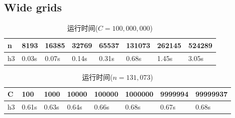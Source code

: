 \subsection{Wide grids}
\begin{table}[H]
  \caption{运行时间($C=100,000,000$)}
  \centering
  \begin{tabular}{p{1.5cm}<{\centering}p{1.5cm}<{\centering}p{1.5cm}<{\centering}p{1.5cm}<{\centering}p{1.5cm}<{\centering}p{1.5cm}<{\centering}p{1.5cm}<{\centering}p{1.5cm}<{\centering}}
  \toprule
   n & 8193 & 16385 & 32769 & 65537 & 131073 &262145 &524289\\
  \midrule
   h3  & 0.03s & 0.07s & 0.14s & 0.31s & 0.68s & 1.45s & 3.05s \\
  \bottomrule
  \end{tabular} 
\end{table}
\begin{table}[H]
  \caption{运行时间($n=131,073$)}
  \label{tab25}
  \centering
  \begin{tabular}{p{1.5cm}<{\centering}p{1.5cm}<{\centering}p{1.5cm}<{\centering}p{1.5cm}<{\centering}p{1.5cm}<{\centering}p{1.5cm}<{\centering}p{1.5cm}<{\centering}p{1.5cm}<{\centering}}
  \toprule
   C & 100 & 1000 & 10000 & 100000 & 1000000 &9999994 & 99999937\\
  \midrule
   h3  & 0.61s & 0.63s & 0.64s & 0.66s & 0.68s & 0.67s & 0.68s \\
  \bottomrule
  \end{tabular} 
\end{table}
